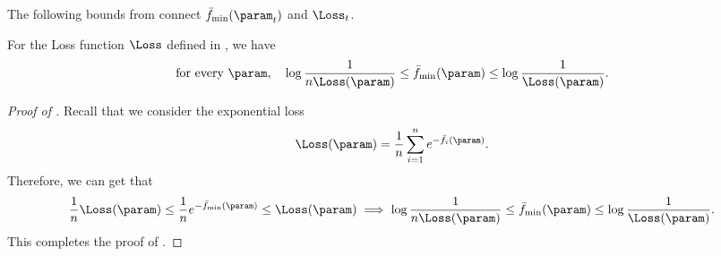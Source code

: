 The following bounds from \citet{lyu2020gradient} connect $\bar  f_{\min}(\param_t)$ and $\Loss_t$. 
\begin{lemma}
    \label{lem:f-min}
For the Loss function $\Loss$ defined in , we have 
    \[
 \text{for every $\param$,}\quad        \log \frac{1}{n \Loss(\param)}\le  \bar f_{\min}(\param) \le \log \frac{1}{\Loss(\param)}.
    \]
\end{lemma}
\begin{proof}[Proof of ]
Recall that we consider the exponential loss
\[
    \Loss(\param) = \frac{1}{n} \sum_{i=1}^n e^{-\bar f_i(\param)}.
\]
Therefore, we can get that
\[
    \frac{1}{n} \Loss(\param) \le \frac{1}{n} e^{-\bar f_{\min}(\param)} \le \Loss(\param) \implies \log \frac{1}{n \Loss(\param)}\le  \bar f_{\min}(\param) \le \log \frac{1}{\Loss(\param)}.
\]
This completes the proof of . 
\end{proof}

